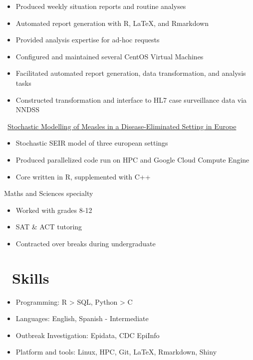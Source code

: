 \documentclass{resume}
\begin{document}
\begin{itemize}
  \item Produced weekly situation reports and routine analyses
  \item Automated report generation with R, \LaTeX, and Rmarkdown
  \item Provided analysis expertise for ad-hoc requests
\end{itemize}

\begin{itemize}
  \item Configured and maintained several CentOS Virtual Machines
  \item Facilitated automated report generation, data transformation, and analysis tasks
  \item Constructed transformation and interface to HL7 case surveillance data via NNDSS
\end{itemize}

\faGithubSquare\ \href{https://github.com/beansrowning/modelling}{Stochastic Modelling of Measles in a Disease-Eliminated Setting in Europe}
\begin{itemize}
  \item Stochastic SEIR model of three european settings
  \item Produced parallelized code run on HPC and Google Cloud Compute Engine
  \item Core written in R, supplemented with C++
\end{itemize}

Maths and Sciences specialty
\begin{itemize}
  \item Worked with grades 8-12
  \item SAT \& ACT tutoring
  \item Contracted over breaks during undergraduate
\end{itemize}

\section{\faCogs\ Skills}
\begin{itemize}[parsep=0.5ex]
  \item Programming: R > SQL, Python > C
  \item Languages: English, Spanish - Intermediate
  \item Outbreak Investigation: Epidata, CDC EpiInfo
  \item Platform and tools: Linux, HPC, Git, \LaTeX, Rmarkdown, Shiny
\end{itemize}
\end{document}
